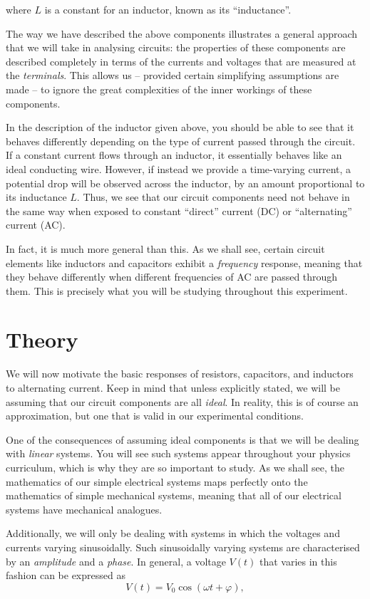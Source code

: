where $L$ is a constant for an inductor, known as its ``inductance''.

The way we have described the above components illustrates a general approach that we will take in analysing circuits: the properties of these components are described completely in terms of the currents and voltages that are measured at the \textsl{terminals}. This allows us -- provided certain simplifying assumptions are made -- to ignore the great complexities of the inner workings of these components.

In the description of the inductor given above, you should be able to see that it behaves differently depending on the type of current passed through the circuit. If a constant current flows through an inductor, it essentially behaves like an ideal conducting wire. However, if instead we provide a time-varying current, a potential drop will be observed across the inductor, by an amount proportional to its inductance $L$. Thus, we see that our circuit components need not behave in the same way when exposed to constant ``direct'' current (DC) or ``alternating'' current (AC).

In fact, it is much more general than this. As we shall see, certain circuit elements like inductors and capacitors exhibit a \textsl{frequency} response, meaning that they behave differently when different frequencies of AC are passed through them. This is precisely what you will be studying throughout this experiment.


\section*{Theory}

We will now motivate the basic responses of resistors, capacitors, and inductors to alternating current. Keep in mind that unless explicitly stated, we will be assuming that our circuit components are all \textsl{ideal}. In reality, this is of course an approximation, but one that is valid in our experimental conditions.

One of the consequences of assuming ideal components is that we will be dealing with \textsl{linear} systems. You will see such systems appear throughout your physics curriculum, which is why they are so important to study. As we shall see, the mathematics of our simple electrical systems maps perfectly onto the mathematics of simple mechanical systems, meaning that all of our electrical systems have mechanical analogues. 

Additionally, we will only be dealing with systems in which the voltages and currents varying sinusoidally. Such sinusoidally varying systems are characterised by an \textsl{amplitude} and a \textsl{phase}. In general, a voltage $V(t)$ that varies in this fashion can be expressed as 
\begin{equation}
    V(t) = V_0 \cos(\omega t + \varphi),
\end{equation}

